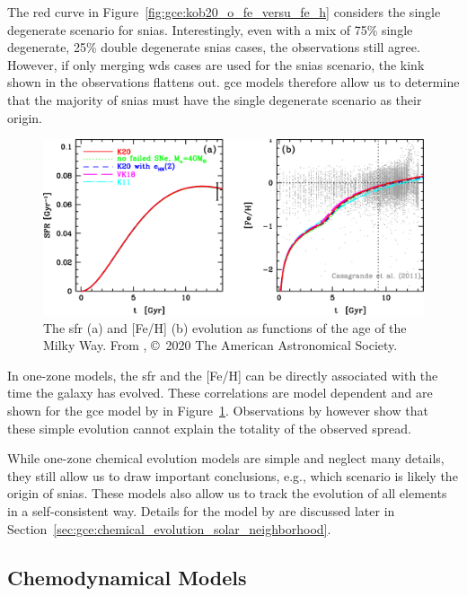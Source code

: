 The red curve in Figure~\ref{fig:gce:kob20_o_fe_versu_fe_h} considers the single degenerate scenario for \acp{snia}. Interestingly, even with a mix of 75\% single degenerate, 25\% double degenerate \acp{snia} cases, the observations still agree. However, if only merging \acp{wd} cases are used for the \acp{snia} scenario, the kink shown in the observations flattens out. \ac{gce} models therefore allow us to determine that the majority of \acp{snia} must have the single degenerate scenario as their origin.

\begin{figure}[tb]
    \centering
    \includegraphics[width=\textwidth]{graphics/gce/kobayashi20_fig1ab}
    \caption{The \ac{sfr} (a) and [Fe/H] (b) evolution as functions of the age of the Milky Way. From \citet{kobayashi20}, \copyright\ 2020 The American Astronomical Society.}
    \label{fig:gce:kob20_sfr_and_fe_h_versus_time}
\end{figure}
In one-zone models, the \ac{sfr} and the [Fe/H] can be directly associated with the time the galaxy has evolved. These correlations are model dependent and are shown for the \ac{gce} model by \citet{kobayashi20} in Figure~\ref{fig:gce:kob20_sfr_and_fe_h_versus_time}. Observations by \citet{casagrande11} however show that these simple evolution cannot explain the totality of the observed spread. 

While one-zone chemical evolution models are simple and neglect many details, they still allow us to draw important conclusions, e.g., which scenario is likely the origin of \acp{snia}. These models also allow us to track the evolution of all elements in a self-consistent way. Details for the model by \citet{kobayashi20} are discussed later in Section~\ref{sec:gce:chemical_evolution_solar_neighborhood}.


\subsection{Chemodynamical Models}

